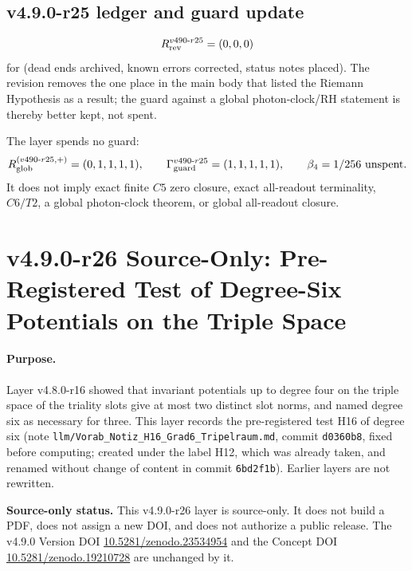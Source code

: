 \subsection*{v4.9.0-r25 ledger and guard update}
\label{subsec:v490-r25-ledger-guard}

\[
R_{\rm rev}^{v490\text{-}r25}=(0,0,0)
\]
for (dead ends archived, known errors corrected, status notes placed).  The revision removes the one place in the main body
that listed the Riemann Hypothesis as a result; the guard against a global photon-clock/RH statement is thereby better kept,
not spent.

The layer spends no guard:
\[
R_{\rm glob}^{(v490\text{-}r25,+)}=(0,1,1,1,1),
\qquad
\Gamma_{\rm guard}^{v490\text{-}r25}=(1,1,1,1,1),
\qquad
\beta_4=1/256\ \text{unspent}.
\]
It does not imply exact finite \(C5\) zero closure, exact all-readout terminality,
\(C6/T2\), a global photon-clock theorem, or global all-readout closure.

\clearpage
\section*{v4.9.0-r26 Source-Only: Pre-Registered Test of Degree-Six Potentials on the Triple Space}
\label{sec:v490-r26-degree-six-triple-space}

\paragraph{Purpose.}
Layer v4.8.0-r16 showed that invariant potentials up to degree four on the triple space of the triality slots give at
most two distinct slot norms, and named degree six as necessary for three.  This layer records the pre-registered test
H16 of degree six (note \texttt{llm/Vorab\_Notiz\_H16\_Grad6\_Tripelraum.md}, commit \texttt{d0360b8}, fixed before
computing; created under the label H12, which was already taken, and renamed without change of content in commit
\texttt{6bd2f1b}).  Earlier layers are not rewritten.

\noindent\textbf{Source-only status.}
This v4.9.0-r26 layer is source-only.  It does not build a PDF, does not assign a new DOI,
and does not authorize a public release.  The v4.9.0 Version DOI
\href{https://doi.org/10.5281/zenodo.23534954}{10.5281/zenodo.23534954} and the Concept DOI
\href{https://doi.org/10.5281/zenodo.19210728}{10.5281/zenodo.19210728} are unchanged by it.

